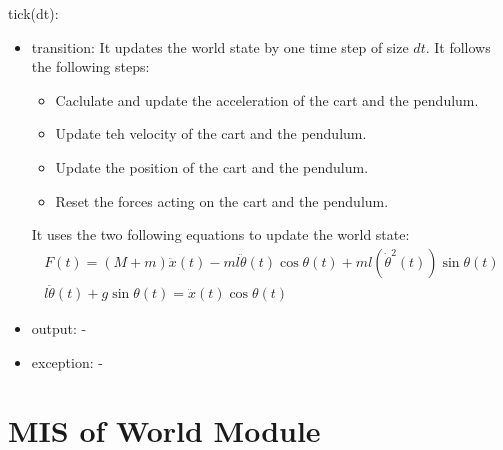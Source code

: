 \documentclass[12pt, titlepage]{article}
\begin{document}
\noindent tick(dt):
\begin{itemize}
\item transition:
      It updates the world state by one time step of size $dt$.
      It follows the following steps:
      \begin{itemize}
        \item Caclulate and update the acceleration of the cart and the pendulum.
        \item Update teh velocity of the cart and the pendulum.
        \item Update the position of the cart and the pendulum.
        \item Reset the forces acting on the cart and the pendulum.
      \end{itemize}
      It uses the two following equations to update the world state:
      \begin{gather*}
        F(t) = (M+m)\ddot{x}(t) - ml\ddot{\theta}(t)\cos{\theta(t)} 
        + ml (\dot{\theta}^2(t)) \sin{\theta(t)} \\
        l \ddot{\theta}(t) + g \sin{\theta(t)} = \ddot{x}(t) \cos{\theta(t)}
      \end{gather*}
\item output: -
\item exception: -
\end{itemize}





\newpage

\section{MIS of World Module} \label{mWorld} 
\end{document}
